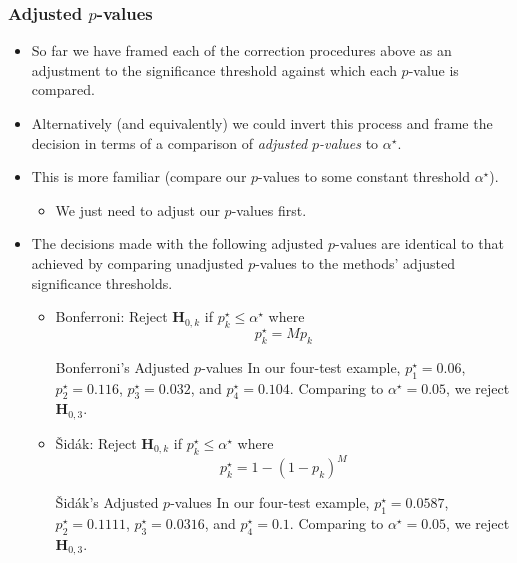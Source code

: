 \subsubsection*{Adjusted $ p $-values}
\begin{itemize}
      \item So far we have framed each of the correction procedures above as an adjustment to the significance
            threshold against which each $p$-value is compared.
      \item Alternatively (and equivalently) we could invert this process and frame the decision in terms of a
            comparison of \emph{adjusted $p$-values} to $ \alpha^\star $.
      \item This is more familiar (compare our $ p $-values to some constant threshold $ \alpha^\star $).
            \begin{itemize}
                  \item We just need to adjust our $p$-values first.
            \end{itemize}
      \item The decisions made with the following adjusted $p$-values are identical to that achieved by comparing
            unadjusted $p$-values to the methods' adjusted significance thresholds.
            \begin{itemize}
                  \item Bonferroni: Reject $ \mathbf{H}_{0,k} $ if $ p_k^\star\le \alpha^\star $ where
                        \[ p_k^\star=Mp_k \]
                        \begin{Example}{Bonferroni's Adjusted $ p $-values}{}
                              In our four-test example, $ p_1^\star=0.06 $, $ p_2^\star=0.116 $, $ p_3^\star=0.032 $, and $ p_4^\star=0.104 $.
                              Comparing to $ \alpha^\star=0.05 $, we reject $ \mathbf{H}_{0,3} $.
                        \end{Example}
                  \item Šidák: Reject $ \mathbf{H}_{0,k} $ if $ p_k^\star\le \alpha^\star $ where
                        \[ p_k^\star=1-(1-p_k)^M \]
                        \begin{Example}{Šidák's Adjusted $ p $-values}{}
                              In our four-test example, $ p_1^\star=0.0587 $, $ p_2^\star=0.1111 $, $ p_3^\star=0.0316 $, and $ p_4^\star=0.1 $.
                              Comparing to $ \alpha^\star=0.05 $, we reject $ \mathbf{H}_{0,3} $.
                        \end{Example}

\end{itemize}
\end{itemize}
